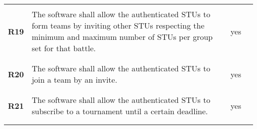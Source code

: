 \begin{longtable}[H]{l p{8cm} l p{2cm}}
                 &                                                                                                                                                                                                                       &                      &                                                                                         \\\hline & & & \\
    \textbf{R19} & The software shall allow the authenticated STUs to form teams by inviting other STUs respecting the minimum and maximum number of STUs per group set for that battle.                                                 & {\color{green}yes}   &                                                                                         \\
                 &                                                                                                                                                                                                                       &                      &                                                                                         \\\hline & & & \\
    \textbf{R20} & The software shall allow the authenticated STUs to join a team by an invite.                                                                                                                                          & {\color{green}yes}   &                                                                                         \\
                 &                                                                                                                                                                                                                       &                      &                                                                                         \\\hline & & & \\
    \textbf{R21} & The software shall allow the authenticated STUs to subscribe to a tournament until a certain deadline.                                                                                                                & {\color{green}yes}   &                                                                                         \\
                 &                                                                                                                                                                                                                       &                      &                                                                                         \\\hline & & & \\

\end{longtable}
